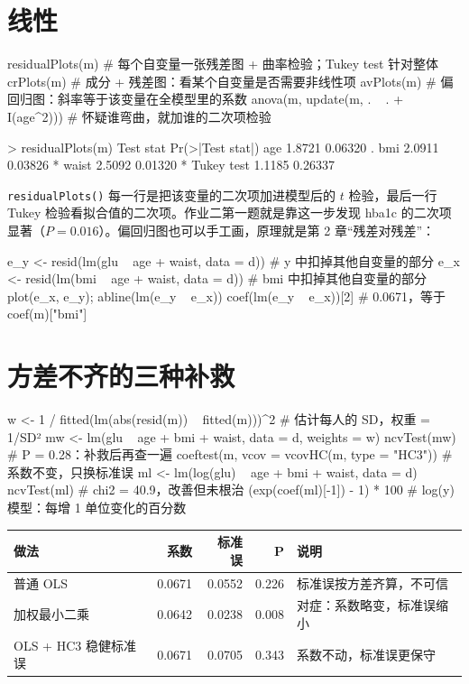 \section{线性}
\begin{rcode}[R · 线性的几种查法]
residualPlots(m)        # 每个自变量一张残差图 + 曲率检验；Tukey test 针对整体
crPlots(m)              # 成分 + 残差图：看某个自变量是否需要非线性项
avPlots(m)              # 偏回归图：斜率等于该变量在全模型里的系数
anova(m, update(m, . ~ . + I(age^2)))     # 怀疑谁弯曲，就加谁的二次项检验
\end{rcode}
\begin{routput}
> residualPlots(m)
           Test stat Pr(>|Test stat|)
age           1.8721          0.06320 .
bmi           2.0911          0.03826 *
waist         2.5092          0.01320 *
Tukey test    1.1185          0.26337
\end{routput}
\Verb|residualPlots()| 每一行是把该变量的二次项加进模型后的 $t$ 检验，最后一行 Tukey 检验看拟合值的二次项。作业二第一题就是靠这一步发现 hba1c 的二次项显著（$P=0.016$）。偏回归图也可以手工画，原理就是第 2 章“残差对残差”：

\begin{rcode}
e_y <- resid(lm(glu ~ age + waist, data = d))   # y 中扣掉其他自变量的部分
e_x <- resid(lm(bmi ~ age + waist, data = d))   # bmi 中扣掉其他自变量的部分
plot(e_x, e_y); abline(lm(e_y ~ e_x))
coef(lm(e_y ~ e_x))[2]                          # 0.0671，等于 coef(m)["bmi"]
\end{rcode}

\section{方差不齐的三种补救}
\begin{rcode}
w  <- 1 / fitted(lm(abs(resid(m)) ~ fitted(m)))^2     # 估计每人的 SD，权重 = 1/SD²
mw <- lm(glu ~ age + bmi + waist, data = d, weights = w)
ncvTest(mw)                                             # P = 0.28：补救后再查一遍
coeftest(m, vcov = vcovHC(m, type = "HC3"))             # 系数不变，只换标准误
ml <- lm(log(glu) ~ age + bmi + waist, data = d)
ncvTest(ml)                                             # chi2 = 40.9，改善但未根治
(exp(coef(ml)[-1]) - 1) * 100                           # log(y) 模型：每增 1 单位变化的百分数
\end{rcode}


\begin{tabular}{lrrrl}
\toprule
做法 & {系数} & {标准误} & {P} & 说明\\
\midrule
普通 OLS & 0.0671 & 0.0552 & 0.226 & 标准误按方差齐算，不可信\\
加权最小二乘 & 0.0642 & 0.0238 & 0.008 & 对症：系数略变，标准误缩小\\
OLS + HC3 稳健标准误 & 0.0671 & 0.0705 & 0.343 & 系数不动，标准误更保守\\
\bottomrule
\end{tabular}

